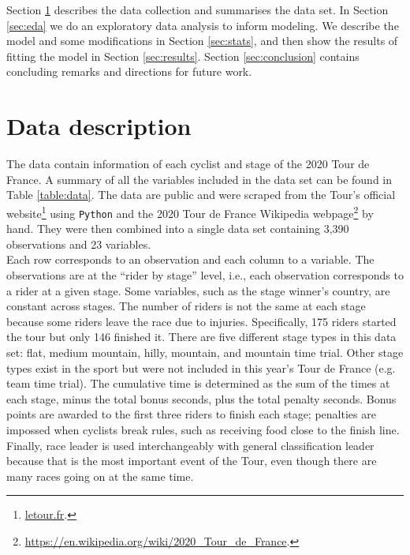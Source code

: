 \documentclass[aos,preprint]{imsart}
\begin{document}
Section \ref{sec:data} describes the data collection and summarises the data set. In Section \ref{sec:eda} we do an exploratory data analysis to inform modeling. We describe the model and some modifications in Section \ref{sec:stats}, and then show the results of fitting the model in Section \ref{sec:results}. Section \ref{sec:conclusion} contains concluding remarks and directions for future work.


\section{Data description} \label{sec:data}


The data contain information of each cyclist and stage of the 2020 Tour de France. A summary of all the variables included in the data set can be found in Table \ref{table:data}. The data are public and were scraped from the Tour's official website\footnote{\url{letour.fr}.} using \texttt{Python} and the 2020 Tour de France Wikipedia webpage\footnote{\url{https://en.wikipedia.org/wiki/2020_Tour_de_France}.} by hand. They were then combined into a single data set containing 3,390 observations and 23 variables. \\

Each row corresponds to an observation and each column to a variable. The observations are at the ``rider by stage'' level, i.e., each observation corresponds to a rider at a given stage. Some variables, such as the stage winner's country, are constant across stages. The number of riders is not the same at each stage because some riders leave the race due to injuries. Specifically, 175 riders started the tour but only 146 finished it. There are five different stage types in this data set: flat, medium mountain, hilly, mountain, and mountain time trial. Other stage types exist in the sport but were not included in this year's Tour de France (e.g. team time trial). The cumulative time is determined as the sum of the times at each stage, minus the total bonus seconds, plus the total penalty seconds. Bonus points are awarded to the first three riders to finish each stage; penalties are impossed when cyclists break rules, such as receiving food close to the finish line. Finally, race leader is used interchangeably with general classification leader because that is the most important event of the Tour, even though there are many races going on at the same time.
\end{document}
